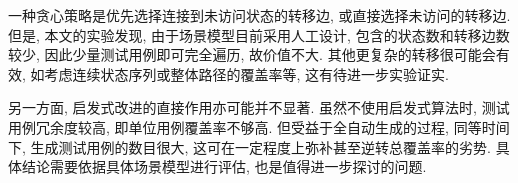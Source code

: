             一种贪心策略是优先选择连接到未访问状态的转移边, 或直接选择未访问的转移边. 但是, 本文的实验发现, 由于场景模型目前采用人工设计, 包含的状态数和转移边数较少, 因此少量测试用例即可完全遍历, 故价值不大. 其他更复杂的转移很可能会有效, 如考虑连续状态序列或整体路径的覆盖率等, 这有待进一步实验证实.
            
            另一方面, 启发式改进的直接作用亦可能并不显著. 虽然不使用启发式算法时, 测试用例冗余度较高, 即单位用例覆盖率不够高. 但受益于全自动生成的过程, 同等时间下, 生成测试用例的数目很大, 这可在一定程度上弥补甚至逆转总覆盖率的劣势. 具体结论需要依据具体场景模型进行评估, 也是值得进一步探讨的问题.
    

